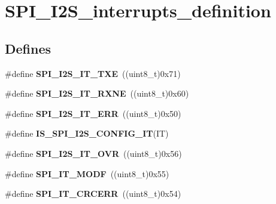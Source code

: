 \hypertarget{group__SPI__I2S__interrupts__definition}{
\section{SPI\_\-I2S\_\-interrupts\_\-definition}
\label{group__SPI__I2S__interrupts__definition}
}
\subsection*{Defines}
\begin{DoxyCompactItemize}
\item 
\hypertarget{group__SPI__I2S__interrupts__definition_ga0f192977fdb12c40d35672b8ae074724}{
\#define {\bfseries SPI\_\-I2S\_\-IT\_\-TXE}~((uint8\_\-t)0x71)}
\label{group__SPI__I2S__interrupts__definition_ga0f192977fdb12c40d35672b8ae074724}

\item 
\hypertarget{group__SPI__I2S__interrupts__definition_gae46dd53cd2e4ad8b8a7836d3dcec57ea}{
\#define {\bfseries SPI\_\-I2S\_\-IT\_\-RXNE}~((uint8\_\-t)0x60)}
\label{group__SPI__I2S__interrupts__definition_gae46dd53cd2e4ad8b8a7836d3dcec57ea}

\item 
\hypertarget{group__SPI__I2S__interrupts__definition_ga1d9d4916bf7ae315f23a54ecfbcd9157}{
\#define {\bfseries SPI\_\-I2S\_\-IT\_\-ERR}~((uint8\_\-t)0x50)}
\label{group__SPI__I2S__interrupts__definition_ga1d9d4916bf7ae315f23a54ecfbcd9157}

\item 
\#define {\bfseries IS\_\-SPI\_\-I2S\_\-CONFIG\_\-IT}(IT)
\item 
\hypertarget{group__SPI__I2S__interrupts__definition_ga279c30176e8ff7e2ec299774a2e88f45}{
\#define {\bfseries SPI\_\-I2S\_\-IT\_\-OVR}~((uint8\_\-t)0x56)}
\label{group__SPI__I2S__interrupts__definition_ga279c30176e8ff7e2ec299774a2e88f45}

\item 
\hypertarget{group__SPI__I2S__interrupts__definition_ga0b9780d5f31fd80f4d0fa7d6860041e9}{
\#define {\bfseries SPI\_\-IT\_\-MODF}~((uint8\_\-t)0x55)}
\label{group__SPI__I2S__interrupts__definition_ga0b9780d5f31fd80f4d0fa7d6860041e9}

\item 
\hypertarget{group__SPI__I2S__interrupts__definition_ga9aa97a5ce8d3500dc14ca4e30eada199}{
\#define {\bfseries SPI\_\-IT\_\-CRCERR}~((uint8\_\-t)0x54)}
\label{group__SPI__I2S__interrupts__definition_ga9aa97a5ce8d3500dc14ca4e30eada199}


\end{DoxyCompactItemize}
